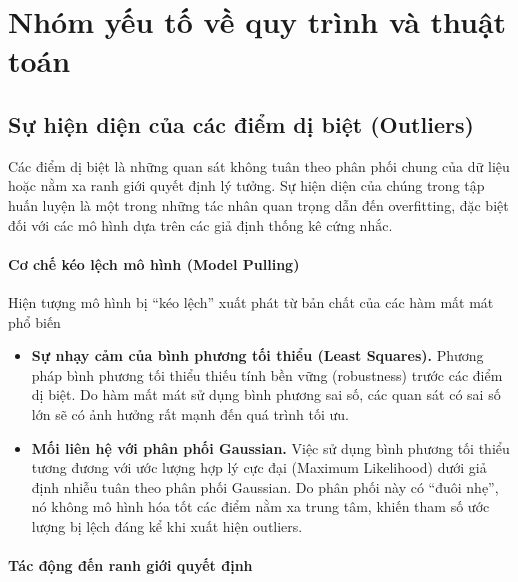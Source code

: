 \section{Nhóm yếu tố về quy trình và thuật toán}
\subsection{Sự hiện diện của các điểm dị biệt (Outliers)}

Các điểm dị biệt là những quan sát không tuân theo phân phối chung của dữ liệu hoặc nằm xa ranh giới quyết định lý tưởng. Sự hiện diện của chúng trong tập huấn luyện là một trong những tác nhân quan trọng dẫn đến overfitting, đặc biệt đối với các mô hình dựa trên các giả định thống kê cứng nhắc.

\paragraph{Cơ chế kéo lệch mô hình (Model Pulling)}

Hiện tượng mô hình bị ``kéo lệch'' xuất phát từ bản chất của các hàm mất mát phổ biến

\begin{itemize}
    \item \textbf{Sự nhạy cảm của bình phương tối thiểu (Least Squares).} Phương pháp bình phương tối thiểu thiếu tính bền vững (robustness) trước các điểm dị biệt. Do hàm mất mát sử dụng bình phương sai số, các quan sát có sai số lớn sẽ có ảnh hưởng rất mạnh đến quá trình tối ưu\cite[p.~185]{Bishop2006}.
    
    \item \textbf{Mối liên hệ với phân phối Gaussian.} Việc sử dụng bình phương tối thiểu tương đương với ước lượng hợp lý cực đại (Maximum Likelihood) dưới giả định nhiễu tuân theo phân phối Gaussian. Do phân phối này có ``đuôi nhẹ'', nó không mô hình hóa tốt các điểm nằm xa trung tâm, khiến tham số ước lượng bị lệch đáng kể khi xuất hiện outliers\cite[p.~29,103]{Bishop2006}.
\end{itemize}

\paragraph{Tác động đến ranh giới quyết định}

